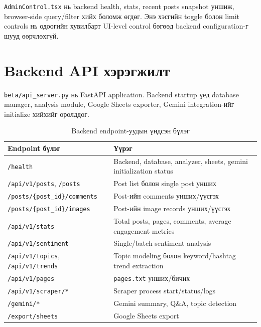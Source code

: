 \documentclass[
12pt,
oneside,
english,
onehalfspacing,
nolistspacing,
headsepline,
]{MUST-Thesis}
\begin{document}
\texttt{AdminControl.tsx} нь backend health, stats, recent posts snapshot уншиж, browser-side query/filter хийх боломж өгдөг. Энэ хэсгийн toggle болон limit controls нь одоогийн хувилбарт UI-level control бөгөөд backend configuration-г шууд өөрчлөхгүй.

\section{Backend API хэрэгжилт}

\texttt{beta/api\_server.py} нь FastAPI application. Backend startup үед database manager, analysis module, Google Sheets exporter, Gemini integration-ийг initialize хийхийг оролддог.

\begin{table}[H]
\centering
\caption{Backend endpoint-уудын үндсэн бүлэг}
\small
\renewcommand{\arraystretch}{1.25}
\begin{adjustbox}{max width=\textwidth}
\begin{tabular}{|L{4.4cm}|L{9.2cm}|}
\hline
{}\textbf{Endpoint бүлэг} & \textbf{Үүрэг} \\
\hline
\texttt{/health} & Backend, database, analyzer, sheets, gemini initialization status \\
\hline
\texttt{/api/v1/posts}, \texttt{/posts} & Post list болон single post унших \\
\hline
\texttt{/posts/\{post\_id\}/}\newline\texttt{comments} & Post-ийн comments унших/үүсгэх \\
\hline
\texttt{/posts/\{post\_id\}/}\newline\texttt{images} & Post-ийн image records унших/үүсгэх \\
\hline
\texttt{/api/v1/stats} & Total posts, pages, comments, average engagement metrics \\
\hline
\texttt{/api/v1/sentiment} & Single/batch sentiment analysis \\
\hline
\texttt{/api/v1/topics}, \texttt{/api/v1/trends} & Topic modeling болон keyword/hashtag trend extraction \\
\hline
\texttt{/api/v1/pages} & \texttt{pages.txt} унших/бичих \\
\hline
\texttt{/api/v1/scraper/*} & Scraper process start/status/logs \\
\hline
\texttt{/gemini/*} & Gemini summary, Q\&A, topic detection \\
\hline
\texttt{/export/sheets} & Google Sheets export \\
\hline
\end{tabular}
\end{adjustbox}
\normalsize
\end{table}
\end{document}

